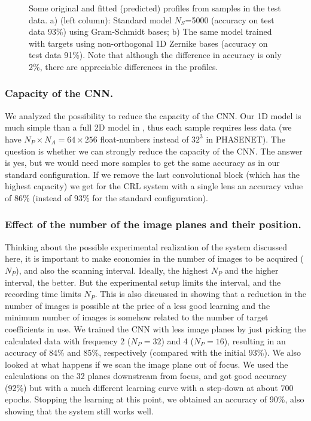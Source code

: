 \documentclass{iucr}
\begin{document}
\begin{figure}
 

    


    \caption{Some original and fitted (predicted) profiles from samples in the test data. a) (left column): Standard model $N_S$=5000 (accuracy on test  data 93\%) using Gram-Schmidt bases;
    b) The same model trained with targets using  non-orthogonal 1D Zernike bases (accuracy on test  data 91\%). Note that although the difference in accuracy is only 2\%, there are appreciable differences in the profiles.
    }
\end{figure}


\subsubsection{Capacity of the CNN.}
We analyzed the possibility to reduce the capacity of the CNN. Our 1D model is much simple than a full 2D model in \cite{Saha2020}, thus each sample requires less data (we have $N_P\times N_A=64\times 256$ float-numbers instead of $32^3$ in PHASENET). The question is whether we can strongly reduce the capacity of the CNN. The answer is yes, but we would need more samples to get the same accuracy as in our standard configuration. If we remove the last convolutional block (which has the highest capacity) we get for the CRL system with a single lens an accuracy value of 86\% (instead of 93\% for the standard configuration).


\subsubsection{Effect of the number of the image planes and their position.}
Thinking about the possible experimental realization of the system discussed here, it is important to make economies in the number of images to be acquired ($N_P$), and also the scanning interval. Ideally, the highest $N_P$ and the higher interval, the better. But the experimental setup limits the interval, and the recording time limits $N_P$. This is also discussed in \cite{Saha2020} showing that a reduction in the number of images is possible at the price of a less good learning and the minimum number of images is somehow related to the number of target coefficients in use. We trained the CNN with less image planes by just picking the calculated data with frequency 2 ($N_P=32$) and 4 ($N_P=16$), resulting in an accuracy of 84\% and 85\%, respectively (compared with the initial 93\%). 
We also looked at what happens if we scan the image plane out of focus. We used the calculations on the 32 planes downstream from focus, and got good accuracy (92\%) but with a much different learning curve with a step-down at about 700 epochs. Stopping the learning at this point, we obtained an accuracy of 90\%, also showing that the system still works well. 
\end{document}
